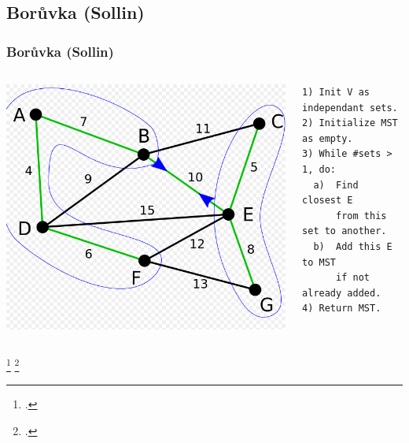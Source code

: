\documentclass{beamer}
\begin{document}
\subsection{Borůvka (Sollin)}
\begin{frame}[fragile]
\frametitle{Borůvka (Sollin)}
\begin{columns}
\begin{column}{.4\linewidth}
\includegraphics[scale=.22]{Sollin.png}
\end{column}

\begin{column}{.5\linewidth}
\begin{verbatim}
1) Init V as independant sets.
2) Initialize MST as empty.
3) While #sets > 1, do:
  a)  Find closest E 
      from this set to another.
  b)  Add this E to MST 
      if not already added.  
4) Return MST.
\end{verbatim}
\end{column}
\end{columns}
\footcite{chung1996parallel}
\footcite{bader2006fast}
\end{frame}
\end{document}
